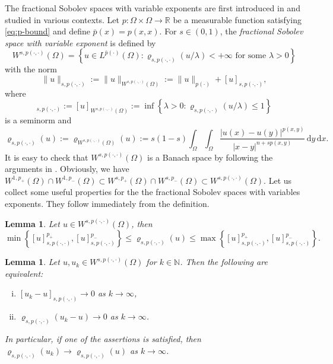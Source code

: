 \documentclass[11pt]{amsart}
\theoremstyle{plain}
\newtheorem{lemma}[theorem]{Lemma}
\theoremstyle{definition}
\numberwithin{equation}{section}
\begin{document}
The fractional Sobolev spaces with variable exponents are first introduced in \cite{KRV17} and studied in various contexts. Let $p: \Omega \times \Omega \to \mathbb{R}$ be a measurable function satisfying \eqref{eq:p-bound} and define $\bar{p}(x) = p(x, x)$. For $s \in (0,1)$, the {\it fractional Sobolev space with variable exponent} is defined by
\begin{equation*}
W^{s, p(\cdot, \cdot)}(\Omega) = \left\lbrace u \in L^{\bar{p}(\cdot)}(\Omega): \varrho_{s, p(\cdot, \cdot)}(u/\lambda) < + \infty \text{ for some } \lambda > 0 \right\rbrace
\end{equation*}
with the norm
\begin{equation*}
\|u\|_{s, p(\cdot, \cdot)} := \|u\|_{W^{s, p(\cdot, \cdot)}(\Omega)} := \|u\|_{p(\cdot)} + [u]_{s, p(\cdot, \cdot)},
\end{equation*}
where
\begin{equation*}
[u]_{s, p(\cdot, \cdot)} := [u]_{W^{s,p(\cdot,\cdot)}(\Omega)} := \inf \left\lbrace \lambda > 0: \varrho_{s,p(\cdot,\cdot)}(u/\lambda) \leq 1 \right\rbrace
\end{equation*}
is a seminorm and
\begin{equation*}
\varrho_{s, p(\cdot, \cdot)}(u) := \varrho_{W^{s,p(\cdot,\cdot)}(\Omega)}(u) := s(1-s) \int_{\Omega} \int_{\Omega} \frac{|u(x)-u(y)|^{p(x,y)}}{|x-y|^{n+sp(x,y)}} \,\mathrm{d}y\,\mathrm{d}x.
\end{equation*}
It is easy to check that $W^{s, p(\cdot, \cdot)}(\Omega)$ is a Banach space by following the arguments in \cite[Proposition 4.24]{DD12}. Obviously, we have $W^{1, p_{+}}(\Omega) \cap W^{1, p_{-}}(\Omega) \subset W^{s, p_{+}}(\Omega) \cap W^{s, p_{-}}(\Omega) \subset W^{s, p(\cdot, \cdot)}(\Omega)$. Let us collect some useful properties for the the fractional Sobolev spaces with variables exponents. They follow immediately from the definition.

\begin{lemma} \label{lem:modular1}
Let $u \in W^{s, p(\cdot, \cdot)}(\Omega)$, then
\begin{equation*}
\min\left\lbrace [u]_{s, p(\cdot, \cdot)}^{p_{+}}, [u]_{s, p(\cdot, \cdot)}^{p_{-}} \right\rbrace \leq \varrho_{s, p(\cdot, \cdot)}(u) \leq \max\left\lbrace [u]_{s, p(\cdot, \cdot)}^{p_{+}}, [u]_{s, p(\cdot, \cdot)}^{p_{-}} \right\rbrace.
\end{equation*}
\end{lemma}

\begin{lemma} \label{lem:modular2}
Let $u, u_{k} \in W^{s, p(\cdot, \cdot)}(\Omega)$ for $k \in \mathbb{N}$. Then the following are equivalent:
\begin{enumerate}[(i)]
\item
$[u_{k}-u]_{s, p(\cdot, \cdot)} \to 0$ as $k \to \infty$,
\item
$\varrho_{s, p(\cdot, \cdot)}(u_{k}-u) \to 0$ as $k \to \infty$.
\end{enumerate}
In particular, if one of the assertions is satisfied, then $\varrho_{s, p(\cdot, \cdot)}(u_{k}) \to \varrho_{s, p(\cdot, \cdot)}(u)$ as $k \to \infty$.
\end{lemma}
\end{document}
